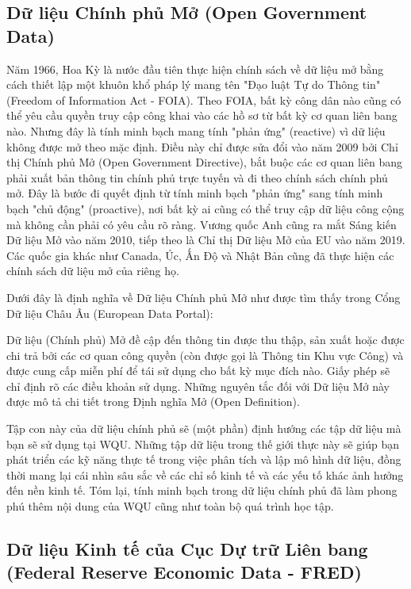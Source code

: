 \subsection[Dữ liệu Chính phủ Mở]{Dữ liệu Chính phủ Mở (Open Government Data)}

Năm 1966, Hoa Kỳ là nước đầu tiên thực hiện chính sách về dữ liệu mở bằng cách thiết lập một khuôn khổ pháp lý mang tên "Đạo luật Tự do Thông tin" (Freedom of Information Act - FOIA). Theo FOIA, bất kỳ công dân nào cũng có thể yêu cầu quyền truy cập công khai vào các hồ sơ từ bất kỳ cơ quan liên bang nào. Nhưng đây là tính minh bạch mang tính "phản ứng" (reactive) vì dữ liệu không được mở theo mặc định. Điều này chỉ được sửa đổi vào năm 2009 bởi Chỉ thị Chính phủ Mở (Open Government Directive), bắt buộc các cơ quan liên bang phải xuất bản thông tin chính phủ trực tuyến và đi theo chính sách chính phủ mở. Đây là bước đi quyết định từ tính minh bạch "phản ứng" sang tính minh bạch "chủ động" (proactive), nơi bất kỳ ai cũng có thể truy cập dữ liệu công cộng mà không cần phải có yêu cầu rõ ràng. Vương quốc Anh cũng ra mắt Sáng kiến Dữ liệu Mở vào năm 2010, tiếp theo là Chỉ thị Dữ liệu Mở của EU vào năm 2019. Các quốc gia khác như Canada, Úc, Ấn Độ và Nhật Bản cũng đã thực hiện các chính sách dữ liệu mở của riêng họ.

Dưới đây là định nghĩa về Dữ liệu Chính phủ Mở như được tìm thấy trong Cổng Dữ liệu Châu Âu (European Data Portal):

Dữ liệu (Chính phủ) Mở đề cập đến thông tin được thu thập, sản xuất hoặc được chi trả bởi các cơ quan công quyền (còn được gọi là Thông tin Khu vực Công) và được cung cấp miễn phí để tái sử dụng cho bất kỳ mục đích nào. Giấy phép sẽ chỉ định rõ các điều khoản sử dụng. Những nguyên tắc đối với Dữ liệu Mở này được mô tả chi tiết trong Định nghĩa Mở (Open Definition).

Tập con này của dữ liệu chính phủ sẽ (một phần) định hướng các tập dữ liệu mà bạn sẽ sử dụng tại WQU. Những tập dữ liệu trong thế giới thực này sẽ giúp bạn phát triển các kỹ năng thực tế trong việc phân tích và lập mô hình dữ liệu, đồng thời mang lại cái nhìn sâu sắc về các chỉ số kinh tế và các yếu tố khác ảnh hưởng đến nền kinh tế. Tóm lại, tính minh bạch trong dữ liệu chính phủ đã làm phong phú thêm nội dung của WQU cũng như toàn bộ quá trình học tập.

\subsection[Dữ liệu Kinh tế của Cục Dự trữ Liên bang]{Dữ liệu Kinh tế của Cục Dự trữ Liên bang (Federal Reserve Economic Data - FRED)}

